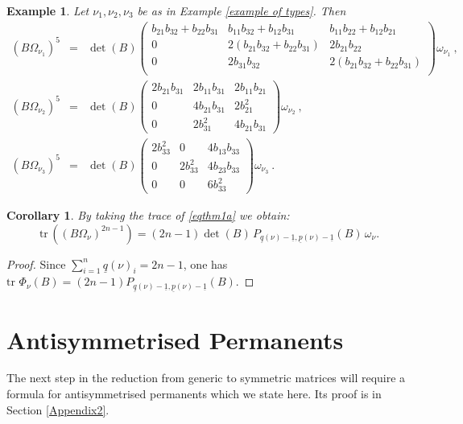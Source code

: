 \documentclass[10pt]{amsart}
\newcommand{\pp}{{\underline{p}}}
\newcommand{\qq}{{\underline{q}}}
\newcommand{\tr}{\mathrm{tr}\,}
\newcommand{\one}{{\underline{1}}}
\theoremstyle{plain}
\newtheorem{cor}[thm]{Corollary}
\newtheorem{ex}[thm]{Example}
\newcommand{\0}{\color{blue}{\mathsf{0}}}
\begin{document}
\begin{ex}\label{BOmegaexplicitex} Let $\nu_1,\nu_2,\nu_3$ be as in Example \ref{example of types}. Then 
\begin{eqnarray}  (B \Omega_{\nu_1} )^5  &= &    \det(B) \begin{pmatrix}   b_{21}b_{32}+b_{22}b_{31} &  
b_{11}b_{3 2}+b_{1 2}b_{3 1}   &   b_{1 1}b_{2 2}+b_{1 2}b_{2 1}   \\ 
 0 &  2  (b_{21}b_{32}+b_{22}b_{31})   & 2 b_{21}b_{2 2} \\ 
0 &  2 b_{31} b_{32}  &   2(b_{21}b_{32}+b_{22}b_{31})  \\
 \end{pmatrix} \omega_{\nu_1} \ ,  \nonumber \\ 
  (B \Omega_{\nu_2} )^5 & =  &   \det(B) \begin{pmatrix}   2 b_{21}b_{3 1}  & 2  b_{1 1} b_{3 1} & 2 b_{11} b_{21} \\
  0 & 4b_{21}b_{3 1}   & 2b_{21}^2 \\ 
  0 &  2 b_{3 1}^2 &   4 b_{21}b_{31}
  \end{pmatrix} \omega_{\nu_2}\ ,\nonumber \\
   (B \Omega_{\nu_3} )^5 & =  &   \det(B)
   \begin{pmatrix}
    2 b_{33}^2 &  0 & 4 b_{13} b_{33}  \\ 
    0 &  2 b_{33}^2  &  4 b_{23} b_{33} \\
    0 &  0 &   6 b_{33}^2 
   \end{pmatrix}  \omega_{\nu_3} \ .\nonumber
   \end{eqnarray}
  \end{ex}


\begin{cor}\label{eqtrcor}
By taking the trace of \eqref{eqthm1a}   we obtain: 
\begin{equation}\label{eqtr}
\tr  \left( \left( B\Omega_{\nu}\right)^{2n-1}\right)  =(2n-1)\det(B)  \, 
P_{\qq(\nu)-\one,\pp(\nu)-\one}(B)\,\omega_\nu .
\end{equation}
\end{cor}
\begin{proof} Since $\sum_{i=1}^n\qq(\nu)_i=2n-1$, one has   $\tr \,\Phi_{\nu}(B) = (2n-1) P_{\qq(\nu)-\one,\pp(\nu)-\one}(B)$. 
\end{proof}

\section{Antisymmetrised Permanents} \label{sect: AntiSymPerm}
The next step in the reduction from generic to symmetric matrices will require a formula for antisymmetrised permanents which we state here. Its proof is in Section \ref{Appendix2}. 
\end{document}

